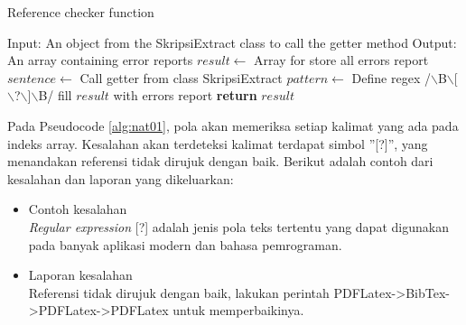 \begin{enumerate}
\begin{minipage}{1.0\linewidth}
\begin{algorithm}[H]
    \caption{Reference checker function}
	\label{alg:nat01}
	\begin{algorithmic}[1]
		\State Input: An object from the SkripsiExtract class to call the getter method
		\State Output: An array containing error reports
		\State
			\State $result \gets$ Array for store all errors report
			\State $sentence \gets$ Call getter from class SkripsiExtract
				\State $pattern \gets$ Define regex /$\backslash$B$\backslash$[ $\backslash$?$\backslash$]$\backslash$B/
                	\State fill $result$ with errors report
            	\EndIf
        	\EndFor
    		\State \textbf{return} $result$
    	\EndFunction
	\end{algorithmic}
\end{algorithm}
\end{minipage}
\medskip

	Pada Pseudocode \ref{alg:nat01}, pola akan memeriksa setiap kalimat yang ada pada indeks array. Kesalahan akan terdeteksi kalimat terdapat simbol ''[?]'', yang menandakan referensi tidak dirujuk dengan baik. Berikut adalah contoh dari kesalahan dan laporan yang dikeluarkan:
	
	\begin{itemize}
		\item Contoh kesalahan \\
		\textit{Regular expression} [?] adalah jenis pola teks tertentu yang dapat digunakan pada banyak aplikasi modern dan bahasa pemrograman.
		\item Laporan kesalahan \\
		Referensi tidak dirujuk dengan baik, lakukan perintah PDFLatex->BibTex->PDFLatex->PDFLatex untuk memperbaikinya.
	\end{itemize}		
	
\end{enumerate}